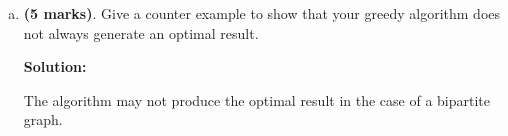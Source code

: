 \begin{homeworkProblem}
\begin{enumerate}[a)]
\clearpage
    
	\item \textbf{(5 marks)}. Give a counter example to show that your greedy 
    algorithm does not always generate an optimal result.
    \par
    \textbf{Solution:}
    \par
    
    The algorithm may not produce the optimal result in the case of a bipartite graph. 
\end{enumerate}

\end{homeworkProblem}
















